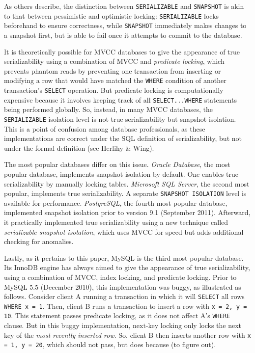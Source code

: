 \documentclass[12pt]{article} %
\begin{document}
As others describe, the distinction between \texttt{SERIALIZABLE} and \texttt{SNAPSHOT} is akin to that between pessimistic and optimistic locking: \texttt{SERIALIZABLE} locks beforehand to ensure correctness, while \texttt{SNAPSHOT} immediately makes changes to a snapshot first, but is able to fail once it attempts to commit to the database. 

It is theoretically possible for MVCC databases to give the appearance of true serializability using a combination of MVCC and \textit{predicate locking}, which prevents phantom reads by preventing one transaction from inserting or modifying a row that would have matched the \texttt{WHERE} condition of another transaction's \texttt{SELECT} operation. But predicate locking is computationally expensive because it involves keeping track of all \texttt{SELECT...WHERE} statements being performed globally. So, instead, in many MVCC databases, the \texttt{SERIALIZABLE} isolation level is not true serializability but snapshot isolation. This is a point of confusion among database professionals, as these implementations are correct under the SQL definition of serializability, but not under the formal definition (see Herlihy \& Wing).

The most popular databases differ on this issue.
\textit{Oracle Database}, the most popular database, implements snapshot isolation by default. One enables true serializability by manually locking tables.
\textit{Microsoft SQL Server}, the second most popular, implements true serializability. A separate \texttt{SNAPSHOT ISOLATION} level is available for performance.
\textit{PostgreSQL}, the fourth most popular database, implemented snapshot isolation prior to version 9.1 (September 2011). Afterward, it practically implemented true serializability using a new technique called \textit{serializable snapshot isolation}, which uses MVCC for speed but adds additional checking for anomalies.

Lastly, as it pertains to this paper, MySQL is the third most popular database. Its InnoDB engine has always aimed to give the appearance of true serializability, using a combination of MVCC, index locking, and predicate locking. Prior to MySQL 5.5 (December 2010), this implementation was buggy, as illustrated as follows. Consider client A running a transaction in which it will \texttt{SELECT} all rows \texttt{WHERE x = 1}. Then, client B runs a transaction to insert a row with \texttt{x = 2, y = 10}. This statement passes predicate locking, as it does not affect A's \texttt{WHERE} clause. But in this buggy implementation, next-key locking only locks the next key of the \textit{most recently inserted row}. So, client B then inserts another row with \texttt{x = 1, y = 20}, which should not pass, but does because (to figure out).
\end{document}
